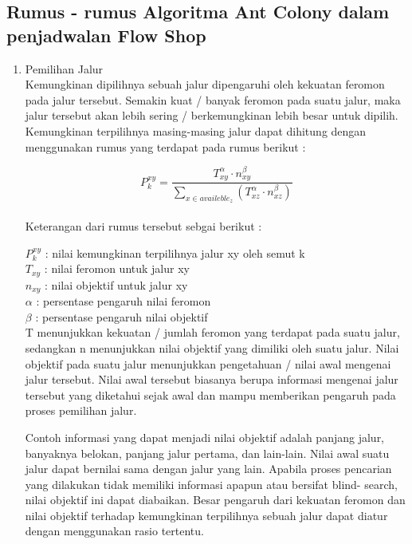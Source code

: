 \subsection{Rumus - rumus Algoritma Ant Colony dalam penjadwalan Flow Shop}
\begin{enumerate}
	\item Pemilihan Jalur\\
	Kemungkinan dipilihnya sebuah jalur dipengaruhi oleh kekuatan feromon pada jalur tersebut. Semakin
	kuat / banyak feromon pada suatu jalur, maka jalur tersebut akan lebih sering / berkemungkinan
	lebih besar untuk dipilih. Kemungkinan terpilihnya masing-masing jalur dapat dihitung
	dengan menggunakan rumus yang terdapat pada rumus berikut :
	
	\begin{equation}
	P_{k}^{xy} = \frac{T_{xy}^{\alpha}\cdot n_{xy}^{\beta}}{\sum_{x \in availeble_z}(T_{xz}^{\alpha }\cdot n_{xz}^{\beta })}
	\end{equation}\\
	
	
	Keterangan dari rumus tersebut sebgai berikut :
	
	$P_{k}^{xy}$ : nilai kemungkinan terpilihnya jalur xy oleh semut k \\
	$T_{xy}$ : nilai feromon untuk jalur xy\\
	$n_{xy}$ : nilai objektif untuk jalur xy\\
	$\alpha$ : persentase pengaruh nilai feromon\\
	$\beta$  : persentase pengaruh nilai objektif\\
	
	
	T menunjukkan kekuatan / jumlah feromon yang terdapat pada suatu jalur, sedangkan n menunjukkan
	nilai objektif yang dimiliki oleh suatu jalur. Nilai objektif pada suatu jalur menunjukkan
	pengetahuan / nilai awal mengenai jalur tersebut. Nilai awal tersebut biasanya berupa informasi
	mengenai jalur tersebut yang diketahui sejak awal dan mampu memberikan pengaruh pada proses
	pemilihan jalur.
	
	Contoh informasi yang dapat menjadi nilai objektif adalah panjang jalur, banyaknya belokan,
	panjang jalur pertama, dan lain-lain. Nilai awal suatu jalur dapat bernilai sama dengan jalur yang
	lain. Apabila proses pencarian yang dilakukan tidak memiliki informasi apapun atau bersifat blind-
	search, nilai objektif ini dapat diabaikan. Besar pengaruh dari kekuatan feromon dan nilai objektif
	terhadap kemungkinan terpilihnya sebuah jalur dapat diatur dengan menggunakan rasio tertentu.
	

\end{enumerate}
